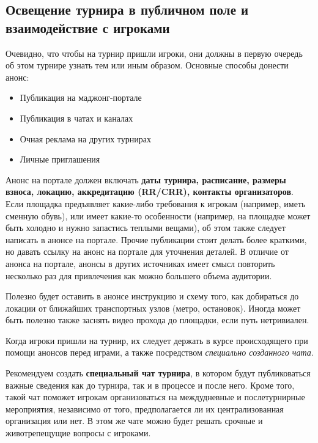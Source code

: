 \subsection{Освещение турнира в публичном поле и взаимодействие с игроками}

Очевидно, что чтобы на турнир пришли игроки, они должны в первую очередь об этом турнире узнать тем или иным образом. Основные способы донести анонс:
\begin{itemize}
	\item Публикация на маджонг-портале
	\item Публикация в чатах и каналах
	\item Очная реклама на других турнирах
	\item Личные приглашения
\end{itemize}

Анонс на портале должен включать \textbf{даты турнира, расписание, размеры взноса, локацию, аккредитацию (RR/CRR), контакты организаторов}. Если площадка предъявляет какие-либо требования к игрокам (например, иметь сменную обувь), или имеет какие-то особенности (например, на площадке может быть холодно и нужно запастись теплыми вещами), об этом также следует написать в анонсе на портале. Прочие публикации стоит делать более краткими, но давать ссылку на анонс на портале для уточнения деталей. В отличие от анонса на портале, анонсы в других источниках имеет смысл повторить несколько раз для привлечения как можно большего объема аудитории.

Полезно будет оставить в анонсе инструкцию и схему того, как добираться до локации от ближайших транспортных узлов (метро, остановок). Иногда может быть полезно также заснять видео прохода до площадки, если путь нетривиален.

Когда игроки пришли на турнир, их следует держать в курсе происходящего при помощи анонсов перед играми, а также посредством \textit{специально созданного чата}.

Рекомендуем создать \textbf{специальный чат турнира}, в котором будут публиковаться важные сведения как до турнира, так и в процессе и после него. Кроме того, такой чат поможет игрокам организоваться на междудневные и послетурнирные мероприятия, независимо от того, предполагается ли их централизованная организация или нет. В этом же чате можно будет решать срочные и животрепещущие вопросы с игроками.


